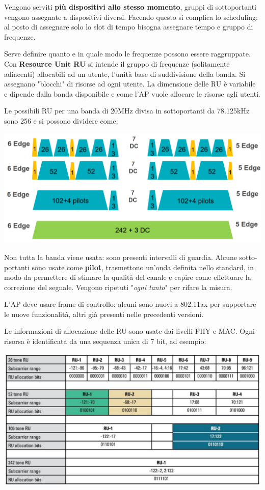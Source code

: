 Vengono serviti \textbf{più dispositivi allo stesso momento}, gruppi di sottoportanti vengono assegnate a dispositivi diversi. Facendo questo si complica lo scheduling: al posto di assegnare solo lo slot di tempo bisogna assegnare tempo e gruppo di frequenze.

Serve definire quanto e in quale modo le frequenze possono essere raggruppate. Con \textbf{Resource Unit RU} si intende il gruppo di frequenze (solitamente adiacenti) allocabili ad un utente, l'unità base di suddivisione della banda. Si assegnano "blocchi" di risorse ad ogni utente. La dimensione delle RU è variabile e dipende dalla banda disponibile e come l'AP vuole allocare le risorse agli utenti.

Le possibili RU per una banda di 20MHz divisa in sottoportanti da 78.125kHz sono 256 e si possono dividere come:
\begin{center}
	\includegraphics[width=0.8\linewidth]{img/wlan/ru1}
\end{center}

Non tutta la banda viene usata: sono presenti intervalli di guardia. Alcune sotto-portanti sono usate come \textbf{pilot}, trasmettono un'onda definita nello standard, in modo da permettere di stimare la qualità del canale e capire come effettuare la correzione del segnale. Vengono ripetuti "\textit{ogni tanto}" per rifare la misura.

L'AP deve usare frame di controllo: alcuni sono nuovi a 802.11ax per supportare le nuove funzionalità, altri già presenti nelle precedenti versioni.

Le informazioni di allocazione delle RU sono usate dai livelli PHY e MAC. Ogni risorsa è identificata da una sequenza unica di 7 bit, ad esempio:
\begin{center}
	\includegraphics[width=0.975\linewidth]{img/wlan/tab3}
\end{center}

